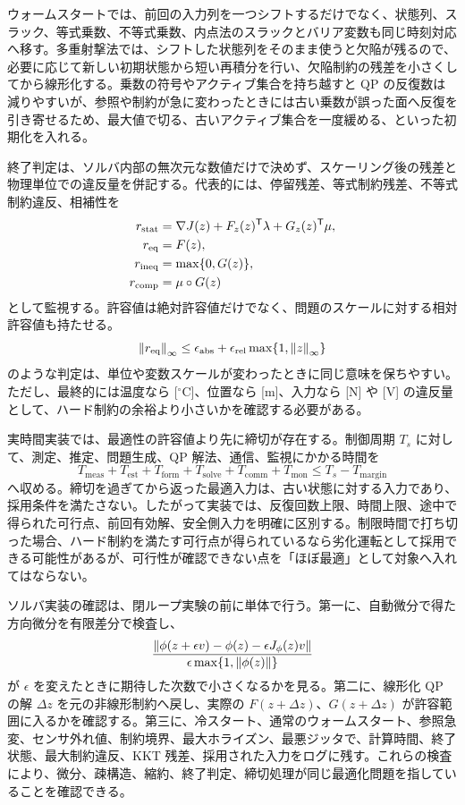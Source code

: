 ウォームスタートでは、前回の入力列を一つシフトするだけでなく、状態列、スラック、等式乗数、不等式乗数、内点法のスラックとバリア変数も同じ時刻対応へ移す。多重射撃法では、シフトした状態列をそのまま使うと欠陥が残るので、必要に応じて新しい初期状態から短い再積分を行い、欠陥制約の残差を小さくしてから線形化する。乗数の符号やアクティブ集合を持ち越すと QP の反復数は減りやすいが、参照や制約が急に変わったときには古い乗数が誤った面へ反復を引き寄せるため、最大値で切る、古いアクティブ集合を一度緩める、といった初期化を入れる。

終了判定は、ソルバ内部の無次元な数値だけで決めず、スケーリング後の残差と物理単位での違反量を併記する。代表的には、停留残差、等式制約残差、不等式制約違反、相補性を
\begin{align}
  r_{\mathrm{stat}}
  &=\nabla J(z)+F_z(z)^{\mathsf{T}}\lambda+G_z(z)^{\mathsf{T}}\mu,\\
  r_{\mathrm{eq}}&=F(z),\\
  r_{\mathrm{ineq}}&=\max\{0,G(z)\},\\
  r_{\mathrm{comp}}&=\mu\circ G(z)
\end{align}
として監視する。許容値は絶対許容値だけでなく、問題のスケールに対する相対許容値も持たせる。
\begin{equation}
  \left\|r_{\mathrm{eq}}\right\|_\infty
  \le
  \epsilon_{\mathrm{abs}}
  +\epsilon_{\mathrm{rel}}\max\{1,\left\|z\right\|_\infty\}
\end{equation}
のような判定は、単位や変数スケールが変わったときに同じ意味を保ちやすい。ただし、最終的には温度なら [$^\circ$C]、位置なら [m]、入力なら [N] や [V] の違反量として、ハード制約の余裕より小さいかを確認する必要がある。

実時間実装では、最適性の許容値より先に締切が存在する。制御周期 $T_s$ に対して、測定、推定、問題生成、QP 解法、通信、監視にかかる時間を
\begin{equation}
  T_{\mathrm{meas}}+T_{\mathrm{est}}+T_{\mathrm{form}}
  +T_{\mathrm{solve}}+T_{\mathrm{comm}}+T_{\mathrm{mon}}
  \le T_s-T_{\mathrm{margin}}
\end{equation}
へ収める。締切を過ぎてから返った最適入力は、古い状態に対する入力であり、採用条件を満たさない。したがって実装では、反復回数上限、時間上限、途中で得られた可行点、前回有効解、安全側入力を明確に区別する。制限時間で打ち切った場合、ハード制約を満たす可行点が得られているなら劣化運転として採用できる可能性があるが、可行性が確認できない点を「ほぼ最適」として対象へ入れてはならない。

ソルバ実装の確認は、閉ループ実験の前に単体で行う。第一に、自動微分で得た方向微分を有限差分で検査し、
\begin{equation}
  \frac{\left\|\phi(z+\epsilon v)-\phi(z)-\epsilon J_\phi(z)v\right\|}
       {\epsilon\max\{1,\left\|\phi(z)\right\|\}}
\end{equation}
が $\epsilon$ を変えたときに期待した次数で小さくなるかを見る。第二に、線形化 QP の解 $\Delta z$ を元の非線形制約へ戻し、実際の $F(z+\Delta z)$、$G(z+\Delta z)$ が許容範囲に入るかを確認する。第三に、冷スタート、通常のウォームスタート、参照急変、センサ外れ値、制約境界、最大ホライズン、最悪ジッタで、計算時間、終了状態、最大制約違反、KKT 残差、採用された入力をログに残す。これらの検査により、微分、疎構造、縮約、終了判定、締切処理が同じ最適化問題を指していることを確認できる。

